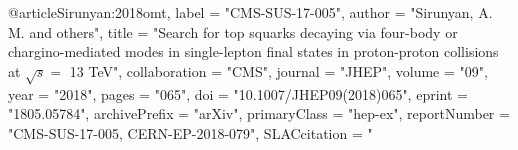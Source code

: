 @article{Sirunyan:2018omt,
      label          = "CMS-SUS-17-005",
      author         = "Sirunyan, A. M. and others",
      title          = "{Search for top squarks decaying via four-body or
                        chargino-mediated modes in single-lepton final states in
                        proton-proton collisions at $\sqrt{s} =$ 13 TeV}",
      collaboration  = "CMS",
      journal        = "JHEP",
      volume         = "09",
      year           = "2018",
      pages          = "065",
      doi            = "10.1007/JHEP09(2018)065",
      eprint         = "1805.05784",
      archivePrefix  = "arXiv",
      primaryClass   = "hep-ex",
      reportNumber   = "CMS-SUS-17-005, CERN-EP-2018-079",
      SLACcitation   = "%
}

